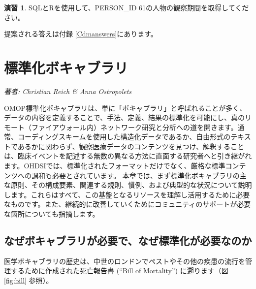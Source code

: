 \documentclass[
  11pt]{book}
\theoremstyle{definition}
\theoremstyle{definition}
\theoremstyle{definition}
\newtheorem{exercise}{演習}[chapter]
\theoremstyle{definition}
\theoremstyle{remark}
\begin{document}
\begin{exercise}
\protect\hypertarget{exr:exercisePerson61Records}{}\label{exr:exercisePerson61Records}SQLとRを使用して、PERSON\_ID 61の人物の観察期間を取得してください。
\end{exercise}

提案される答えは付録 \ref{Cdmanswers}にあります。

\chapter{標準化ボキャブラリ}\label{StandardizedVocabularies}


\emph{著者: Christian Reich \& Anna Ostropolets}

OMOP標準化ボキャブラリは、単に「ボキャブラリ」と呼ばれることが多く、データの内容を定義することで、手法、定義、結果の標準化を可能にし、真のリモート（ファイアウォール内）ネットワーク研究と分析への道を開きます。通常、コーディングスキームを使用した構造化データであるか、自由形式のテキストであるかに関わらず、観察医療データのコンテンツを見つけ、解釈することは、臨床イベントを記述する無数の異なる方法に直面する研究者へと引き継がれます。OHDSIでは、標準化されたフォーマットだけでなく、厳格な標準コンテンツへの調和も必要とされています。 本章では、まず標準化ボキャブラリの主な原則、その構成要素、関連する規則、慣例、および典型的な状況について説明します。これらはすべて、この基盤となるリソースを理解し活用するために必要なものです。また、継続的に改善していくためにコミュニティのサポートが必要な箇所についても指摘します。

\section{なぜボキャブラリが必要で、なぜ標準化が必要なのか}\label{ux306aux305cux30dcux30adux30e3ux30d6ux30e9ux30eaux304cux5fc5ux8981ux3067ux306aux305cux6a19ux6e96ux5316ux304cux5fc5ux8981ux306aux306eux304b}

医学ボキャブラリの歴史は、中世のロンドンでペストやその他の疾患の流行を管理するために作成された死亡報告書 (``Bill of Mortality'') に遡ります（図 \ref{fig:bill} 参照）。
\end{document}
